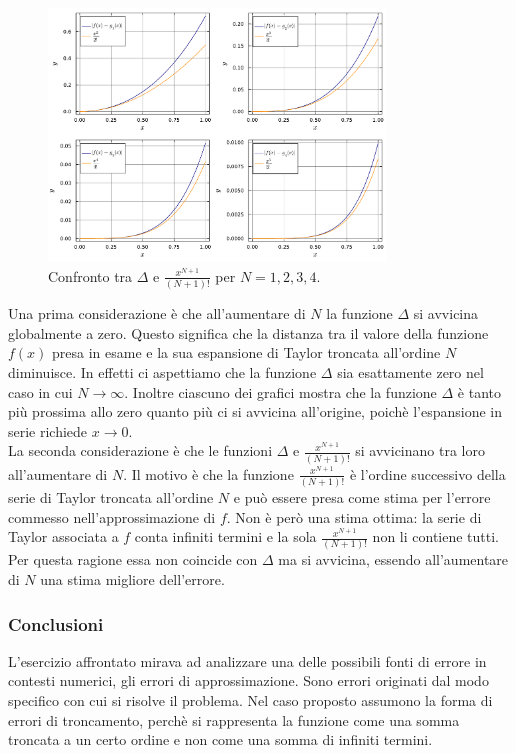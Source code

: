 \documentclass[letterpaper, 12pt]{article}
\numberwithin{equation}{section}    %
\begin{document}
\begin{figure}[!ht]
    \centering
    \includegraphics[width=0.8\textwidth]{1011.pdf}
    \caption{Confronto tra $\Delta$ e $\frac{x^{N+1}}{(N+1)!}$ per $N=1,2,3, 4$.}
    \label{fig:es1_0_1_1}
\end{figure}


Una prima considerazione è che all'aumentare di $N$ la funzione $\Delta$ 
si avvicina globalmente a zero. Questo significa che la distanza tra il valore 
della funzione $f(x)$ presa in esame e la sua espansione di Taylor troncata all'ordine 
$N$ diminuisce. In effetti ci aspettiamo che la funzione $\Delta$ sia 
esattamente zero nel caso in cui $N \rightarrow \infty$. Inoltre ciascuno dei grafici mostra che la funzione 
$\Delta$ è tanto più prossima allo zero quanto più ci si avvicina all'origine, poichè l'espansione in serie 
richiede $x \rightarrow 0$.\\
La seconda considerazione è che le funzioni $\Delta$ e $\frac{x^{N+1}}{(N+1)!}$ si 
avvicinano tra loro all'aumentare di $N$. Il motivo è che la funzione $\frac{x^{N+1}}{(N+1)!}$ è 
l'ordine successivo della serie di Taylor troncata all'ordine $N$ e può essere presa come stima per 
l'errore commesso nell'approssimazione di $f$. Non è però una stima ottima: la serie di Taylor associata a $f$ 
conta infiniti termini e la sola $\frac{x^{N+1}}{(N+1)!}$ non li contiene tutti. Per questa ragione essa non 
coincide con $\Delta$ ma si avvicina, essendo all'aumentare di $N$ una stima migliore dell'errore.

\subsubsection{Conclusioni}
L'esercizio affrontato mirava ad analizzare una delle possibili fonti di errore in contesti numerici, 
gli errori di approssimazione. Sono errori originati dal modo specifico con cui si risolve il problema.
Nel caso proposto assumono la forma di errori di troncamento, perchè si rappresenta la funzione come una somma 
troncata a un certo ordine e non come una somma di infiniti termini.
\end{document}
